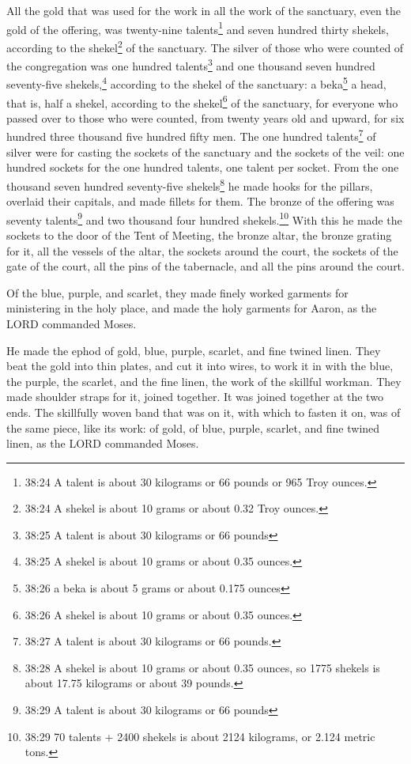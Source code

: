 \myverse{}All the gold that was used for the work in all the work of the
sanctuary, even the gold of the offering, was twenty-nine talents\footnote{38:24 A talent is about 30 kilograms or 66 pounds or 965 Troy ounces.} and seven hundred thirty
shekels, according to the shekel\footnote{38:24 A shekel is about 10 grams or about 0.32 Troy ounces.} of the sanctuary.
\myverse{}The silver of those who were counted of the congregation was one hundred
talents\footnote{38:25 A talent is about 30 kilograms or 66 pounds} and one thousand seven hundred seventy-five
shekels,\footnote{38:25 A shekel is about 10 grams or about 0.35 ounces.} according to the shekel of the sanctuary:
\myverse{}a beka\footnote{38:26 a beka is about 5 grams or about 0.175 ounces} a head, that is, half a shekel, according
to the shekel\footnote{38:26 A shekel is about 10 grams or about 0.35 ounces.} of the sanctuary, for everyone who
passed over to those who were counted, from twenty years old and upward, for six hundred three thousand
five hundred fifty men.
\myverse{}The one hundred talents\footnote{38:27 A talent is about 30 kilograms or 66 pounds.} of silver were for casting the sockets
of the sanctuary and the sockets of the veil: one hundred sockets for the one hundred talents, one talent
per socket.
\myverse{}From the one thousand seven hundred seventy-five shekels\footnote{38:28 A shekel is about 10 grams or about 0.35 ounces, so 1775 shekels is about 17.75 kilograms or
	about 39 pounds.} he made hooks for the pillars, overlaid their capitals, and made fillets for
them.
\myverse{}The bronze of the offering was seventy talents\footnote{38:29 A talent is about 30 kilograms or 66 pounds} and two thousand four hundred shekels.\footnote{38:29 70 talents + 2400 shekels is about 2124 kilograms, or 2.124 metric tons.}
\myverse{}With this he made the sockets to the door of the Tent of Meeting, the bronze
altar, the bronze grating for it, all the vessels of the altar,
\myverse{}the sockets around the court, the sockets of the gate of the court, all the
pins of the tabernacle, and all the pins around the court.


\mychapter{} \myverse*{}Of the blue, purple, and scarlet, they made finely worked garments
for ministering in the holy place, and made the holy garments for Aaron, as the LORD commanded Moses.


\myverse{}He made the ephod of gold, blue, purple, scarlet, and fine twined
linen.
\myverse{}They beat the gold into thin plates, and cut it into wires, to work it in with
the blue, the purple, the scarlet, and the fine linen, the work of the skillful workman.
\myverse{}They made shoulder straps for it, joined together. It was joined together at
the two ends.
\myverse{}The skillfully woven band that was on it, with which to fasten it on, was of
the same piece, like its work: of gold, of blue, purple, scarlet, and fine twined linen, as the LORD commanded
Moses.


